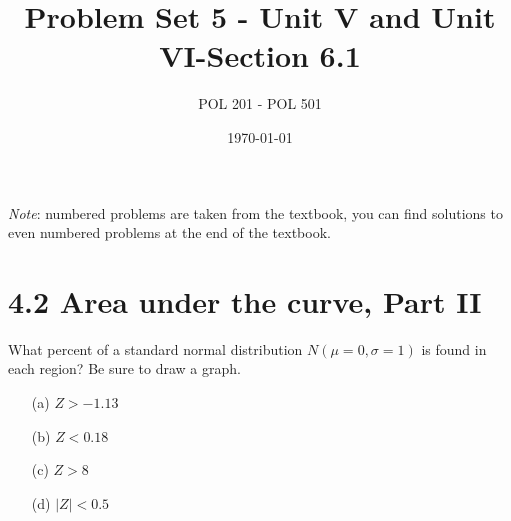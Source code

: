 \documentclass{article}
\title{Problem Set 5 - Unit V and Unit VI-Section 6.1}
\author{POL 201 - POL 501}
\date{\today}
\begin{document}
\maketitle

\emph{Note}: numbered problems are taken from the textbook, you can find solutions to even numbered problems at the end of the textbook.


\section*{4.2 Area under the curve, Part II}
What percent of a standard normal distribution \( N(\mu = 0, \sigma = 1) \) is found in each region? Be sure to draw a graph.
\begin{itemize}
    \item[(a)] \( Z > -1.13 \)
    \item[(b)] \( Z < 0.18 \)
    \item[(c)] \( Z > 8 \)
    \item[(d)] \( |Z| < 0.5 \)
\end{itemize}
\end{document}
